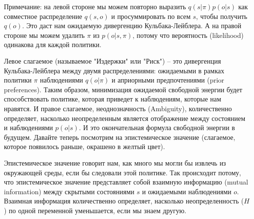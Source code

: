 \documentclass[12pt]{article}
\begin{document}
Примечание: на левой стороне мы можем повторно выразить $q(s|\pi) p(o|s)$ как совместное распределение $q(s,o)$ и просуммировать по всем $s$, чтобы получить $q(o)$. Это даст нам ожидаемую дивергенцию Кульбака-Лейблера. А на правой стороне мы можем удалить $\pi$ из $p(o|s,\pi)$, потому что вероятность (likelihood) одинакова для каждой политики.


Левое слагаемое (называемое "Издержки" или "Риск") -- это дивергенция Кульбака-Лейблера между двумя распределениями: ожидаемыми в рамках политики $\pi$ наблюдениями $q(o|\pi)$ и априорными предпочтениями (prior preferences). Таким образом, минимизация ожидаемой свободной энергии будет способствовать политике, которая приведет к наблюдениям, которые нам нравятся. И правое слагаемое, неоднозначность (Ambiguity), количественно определяет, насколько неопределенным является отображение между состоянием и наблюдениями $p(o|s)$. И это окончательная формула свободной энергии в будущем. Давайте теперь посмотрим на эпистемическое значение (слагаемое, которое появилось раньше, окрашено в желтый цвет).


Эпистемическое значение говорит нам, как много мы могли бы извлечь из окружающей среды, если бы следовали этой политике. Так происходит потому, что эпистемическое значение представляет собой взаимную информацию (mutual information) между скрытыми состояниями $s$ и ожидаемыми наблюдениями $o$. Взаимная информация количественно определяет, насколько неопределенность ($H$) по одной переменной уменьшается, если мы знаем другую.

\end{document}

